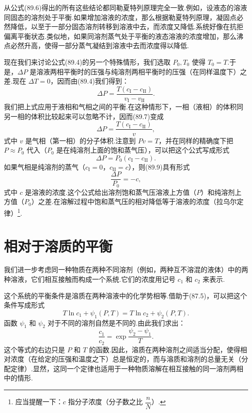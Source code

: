 从公式(89.6)得出的所有这些结论都同勒夏特列原理完全一致.例如，设液态的溶液同固态的溶剂处于平衡.如果增加溶液的浓度，那么根据勒夏特列原理，凝固点必然降低，以至于一部分固态溶剂转移到溶液中去，而浓度又降低.系统好像在抗拒偏离平衡状态.类似地，如果同溶剂蒸气处于平衡的液态溶液的浓度增加，那么沸点必然升高，使得一部分蒸气凝结到溶液中去而浓度得以降低.

现在我们来讨论公式(89.4)的另一个特殊情形，我们选取 $P_0,T_0$ 使得 $T_0=T$.于是，$\Delta P$ 是溶液两相平衡时的压强与纯溶剂两相平衡时的压强（在同样温度下）之差.现在 $\Delta T=0$，因而由(89.4)我们得到：
\begin{equation}
  \Delta P=\frac{T(c_{\mathrm{I}}-c_{\mathrm{II}})}
  {v_{\mathrm{I}}-v_{\mathrm{II}}}.
\end{equation}
我们把上式应用于液相和气相之间的平衡.在这种情形下，一相（液相）的体积同另一相的体积比较起来可以忽略不计，因而(89.7)变成
\begin{equation}
  \Delta P=\frac{T(c_{\mathrm{I}}-c_{\mathrm{II}})}{v},
\end{equation}
式中 $v$ 是气相（第一相）的分子体积.注意到 $Pv=T$，并在同样的精确度下把 $P\approx P_0$ 代入（$P_0$ 是在纯溶剂上面的饱和蒸气压），可以把这个公式写成形式
\begin{equation}
  \Delta P=P_0(c_{\mathrm{I}}-c_{\mathrm{II}}).
\end{equation}
如果气相是纯溶剂的蒸气（$c_{\mathrm{I}}=0$，$c_{\mathrm{II}}=c$），则(89.9)具有形式
\begin{equation}
  \frac{\Delta P}{P_0}=-c,
\end{equation}
式中 $c$ 是溶液的浓度.这个公式给出溶剂饱和蒸气压溶液上方值（$P$）和纯溶剂上方值（$P_0$）之差.在溶解过程中饱和蒸气压的相对降低等于溶液的浓度（拉乌尔定律）\footnote{应当提醒一下：$c$ 指分子浓度（分子数之比 $\dfrac{n}{N}$）.}.

\section{相对于溶质的平衡}

我们进一步考虑同一种物质在两种不同溶剂（例如，两种互不溶混的液体）中的两种溶液，它们相互接触而构成一个系统.它们的浓度用记号 $c_1$ 和 $c_2$ 来表示.

这个系统的平衡条件是溶质在两种溶液中的化学势相等.借助于(87.5)，可以把这个条件写成形式
\begin{equation*}
  T\ln c_1+\psi_1(P,T)=T\ln c_2+\psi_2(P,T).
\end{equation*}
函数 $\psi_1$ 和 $\psi_2$ 对于不同的溶剂自然是不同的.由此我们求出：
\begin{equation}
  \frac{c_1}{c_2}=\exp\frac{\psi_2-\psi_1}{T}.
\end{equation}
这个等式的右边只是 $P$ 和 $T$ 的函数.因此，溶质在两种溶剂之间适当分配，使得相对浓度（在给定的压强和温度之下）总是恒定的，而与溶质和溶剂的总量无关（分配定律）.显然，这同一个定律也适用于一种物质溶解在相互接触的同一溶剂两相中的情形.

